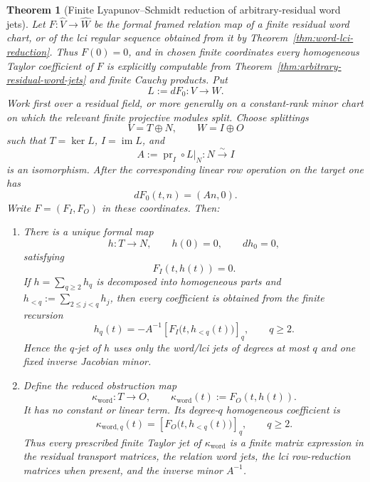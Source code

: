 \documentclass[11pt]{article}
\newtheorem{theorem}{Theorem}[section]
\theoremstyle{definition}
\begin{document}
\begin{theorem}[Finite Lyapunov--Schmidt reduction of arbitrary-residual word jets]\label{thm:word-jet-lyapunov-schmidt}
Let $F:\widehat V\to\widehat W$ be the formal framed relation map of a
finite residual word chart, or of the lci regular sequence obtained from it
by Theorem~\ref{thm:word-lci-reduction}.  Thus $F(0)=0$, and in chosen
finite coordinates every homogeneous Taylor coefficient of $F$ is explicitly
computable from Theorem~\ref{thm:arbitrary-residual-word-jets} and finite
Cauchy products.  Put
\[
 L:=dF_0:V\longrightarrow W.
\]
Work first over a residual field, or more generally on a constant-rank
minor chart on which the relevant finite projective modules split.  Choose
splittings
\[
 V=T\oplus N,
 \qquad
 W=I\oplus O
\]
such that $T=\ker L$, $I=\operatorname{im}L$, and
\[
 A:=\operatorname{pr}_I\circ L|_N:N\xrightarrow{\sim}I
\]
is an isomorphism.  After the corresponding linear row operation on the
target one has
\[
 dF_0(t,n)=(An,0).
\]
Write $F=(F_I,F_O)$ in these coordinates.  Then:
\begin{enumerate}[label=\textnormal{(\roman*)}]
\item There is a unique formal map
\[
 h:T\longrightarrow N,
 \qquad h(0)=0,
 \qquad dh_0=0,
\]
satisfying
\begin{equation}\label{eq:word-ls-solved-equations}
 F_I(t,h(t))=0.
\end{equation}
If $h=\sum_{q\ge2}h_q$ is decomposed into homogeneous parts and
$h_{<q}:=\sum_{2\le j<q}h_j$, then every coefficient is obtained from the
finite recursion
\begin{equation}\label{eq:word-ls-recursion}
 h_q(t)
 =-A^{-1}
 \left[F_I\bigl(t,h_{<q}(t)\bigr)\right]_q,
 \qquad q\ge2.
\end{equation}
Hence the $q$-jet of $h$ uses only the word/lci jets of degrees at most $q$
and one fixed inverse Jacobian minor.

\item Define the reduced obstruction map
\begin{equation}\label{eq:word-ls-kuranishi}
 \kappa_{\mathrm{word}}:T\longrightarrow O,
 \qquad
 \kappa_{\mathrm{word}}(t):=F_O(t,h(t)).
\end{equation}
It has no constant or linear term.  Its degree-$q$ homogeneous coefficient is
\begin{equation}\label{eq:word-ls-kuranishi-jet}
 \kappa_{\mathrm{word},q}(t)
 =\left[F_O\bigl(t,h_{<q}(t)\bigr)\right]_q,
 \qquad q\ge2.
\end{equation}
Thus every prescribed finite Taylor jet of $\kappa_{\mathrm{word}}$ is a
finite matrix expression in the residual transport matrices, the relation
word jets, the lci row-reduction matrices when present, and the inverse
minor $A^{-1}$.


\end{enumerate}
\end{theorem}
\end{document}
